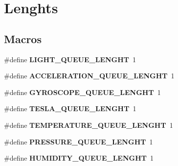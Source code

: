 \hypertarget{group___queue}{}\section{Lenghts}
\label{group___queue}
\subsection*{Macros}
\begin{DoxyCompactItemize}
\item 
\hypertarget{group___queue_gadf47bed64774b5205ac9ce0915495fba}{}\#define {\bfseries L\+I\+G\+H\+T\+\_\+\+Q\+U\+E\+U\+E\+\_\+\+L\+E\+N\+G\+H\+T}~1\label{group___queue_gadf47bed64774b5205ac9ce0915495fba}

\item 
\hypertarget{group___queue_ga8e2cc5b252f8352f263a6e82845ea280}{}\#define {\bfseries A\+C\+C\+E\+L\+E\+R\+A\+T\+I\+O\+N\+\_\+\+Q\+U\+E\+U\+E\+\_\+\+L\+E\+N\+G\+H\+T}~1\label{group___queue_ga8e2cc5b252f8352f263a6e82845ea280}

\item 
\hypertarget{group___queue_ga5d3d42ceda3dce8ca2fff6bc0adcd6e3}{}\#define {\bfseries G\+Y\+R\+O\+S\+C\+O\+P\+E\+\_\+\+Q\+U\+E\+U\+E\+\_\+\+L\+E\+N\+G\+H\+T}~1\label{group___queue_ga5d3d42ceda3dce8ca2fff6bc0adcd6e3}

\item 
\hypertarget{group___queue_ga64f2ab7922cd99fb1e73b4e56c77f9a0}{}\#define {\bfseries T\+E\+S\+L\+A\+\_\+\+Q\+U\+E\+U\+E\+\_\+\+L\+E\+N\+G\+H\+T}~1\label{group___queue_ga64f2ab7922cd99fb1e73b4e56c77f9a0}

\item 
\hypertarget{group___queue_ga2b9161f8c2d0b38f6568fb5a66a7a600}{}\#define {\bfseries T\+E\+M\+P\+E\+R\+A\+T\+U\+R\+E\+\_\+\+Q\+U\+E\+U\+E\+\_\+\+L\+E\+N\+G\+H\+T}~1\label{group___queue_ga2b9161f8c2d0b38f6568fb5a66a7a600}

\item 
\hypertarget{group___queue_ga9456499ec7a0c5946705d522db1d3ec7}{}\#define {\bfseries P\+R\+E\+S\+S\+U\+R\+E\+\_\+\+Q\+U\+E\+U\+E\+\_\+\+L\+E\+N\+G\+H\+T}~1\label{group___queue_ga9456499ec7a0c5946705d522db1d3ec7}

\item 
\hypertarget{group___queue_ga9a8f37acbba82eba76bf9565d46736a9}{}\#define {\bfseries H\+U\+M\+I\+D\+I\+T\+Y\+\_\+\+Q\+U\+E\+U\+E\+\_\+\+L\+E\+N\+G\+H\+T}~1\label{group___queue_ga9a8f37acbba82eba76bf9565d46736a9}


\end{DoxyCompactItemize}
